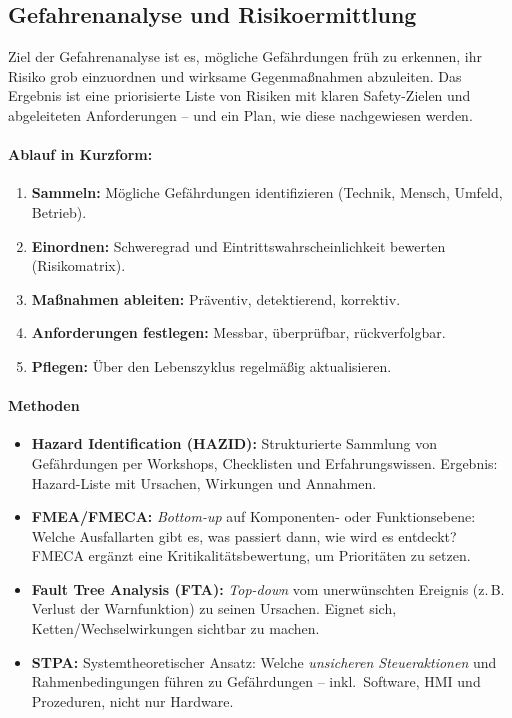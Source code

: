 \subsection{Gefahrenanalyse und Risikoermittlung}
Ziel der Gefahrenanalyse ist es, mögliche Gefährdungen früh zu erkennen, ihr Risiko grob einzuordnen und wirksame Gegenmaßnahmen abzuleiten. Das Ergebnis ist eine priorisierte Liste von Risiken mit klaren Safety-Zielen und abgeleiteten Anforderungen – und ein Plan, wie diese nachgewiesen werden.

\paragraph{Ablauf in Kurzform:}
\begin{enumerate}
  \item \textbf{Sammeln:} Mögliche Gefährdungen identifizieren (Technik, Mensch, Umfeld, Betrieb).
  \item \textbf{Einordnen:} Schweregrad und Eintrittswahrscheinlichkeit bewerten (Risikomatrix).
  \item \textbf{Maßnahmen ableiten:} Präventiv, detektierend, korrektiv.
  \item \textbf{Anforderungen festlegen:} Messbar, überprüfbar, rückverfolgbar.
  \item \textbf{Pflegen:} Über den Lebenszyklus regelmäßig aktualisieren.
\end{enumerate}

\paragraph{Methoden}
\begin{itemize}
  \item \textbf{Hazard Identification (HAZID):} Strukturierte Sammlung von Gefährdungen per Workshops, Checklisten und Erfahrungswissen. Ergebnis: Hazard-Liste mit Ursachen, Wirkungen und Annahmen.
  \item \textbf{FMEA/FMECA:} \emph{Bottom-up} auf Komponenten- oder Funktionsebene: Welche Ausfallarten gibt es, was passiert dann, wie wird es entdeckt? FMECA ergänzt eine Kritikalitätsbewertung, um Prioritäten zu setzen.
  \item \textbf{Fault Tree Analysis (FTA):} \emph{Top-down} vom unerwünschten Ereignis (z.\,B. Verlust der Warnfunktion) zu seinen Ursachen. Eignet sich, Ketten/Wechselwirkungen sichtbar zu machen.
  \item \textbf{STPA:} Systemtheoretischer Ansatz: Welche \emph{unsicheren Steueraktionen} und Rahmenbedingungen führen zu Gefährdungen – inkl.\ Software, HMI und Prozeduren, nicht nur Hardware.
\end{itemize}

